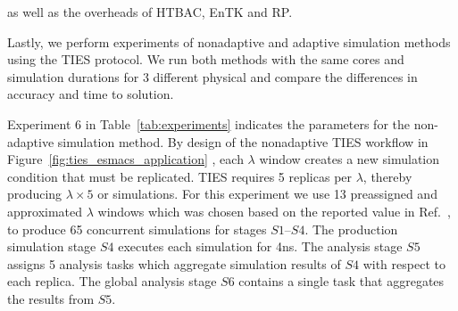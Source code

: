 as well as the overheads of  HTBAC, EnTK
and RP. 


Lastly, we perform experiments of nonadaptive and adaptive simulation methods 
using the TIES protocol. We run both methods with the same cores and simulation
durations for 3 different physical and compare the differences in accuracy and 
time to solution. 


Experiment 6 in Table~\ref{tab:experiments} indicates the parameters for the 
non-adaptive simulation method. By design of the nonadaptive TIES workflow in 
Figure~\ref{fig:ties_esmacs_application} 
, 
each $\lambda$ window creates a new
simulation condition that must be replicated. TIES requires 5 replicas per
$\lambda$, thereby producing $\lambda \times 5$ or simulations. For this 
experiment we use 13 preassigned and approximated $\lambda$ windows which was 
chosen based on the reported value in Ref.~\cite{Bhati2017}, to produce 
65 concurrent simulations for stages $S1$--$S4$.
The production simulation stage 
$S4$ executes each simulation for 4ns. The analysis stage $S5$ assigns 5 analysis
tasks which aggregate simulation results of $S4$ with respect to each
replica. The global analysis stage $S6$ contains a single task that
aggregates the results from $S5$.



